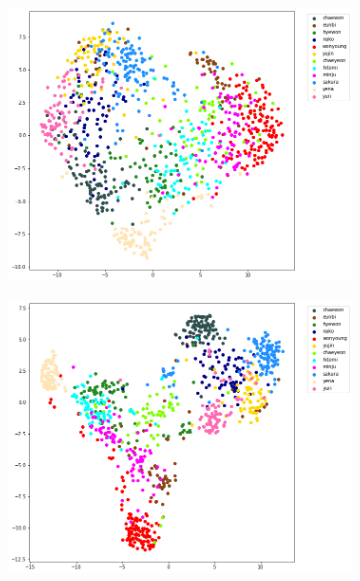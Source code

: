 \begin{enumerate}[left=0pt]
\begin{figure}[htbp]
    \centering
    \begin{subfigure}{0.24\textwidth}
        \includegraphics[trim=45 20 100 0, clip, width=\textwidth]{images/faceReco/nn1-and-triplet/tsne-1.png}     
    \end{subfigure}
    \hfill
    \begin{subfigure}{0.24\textwidth}
        \includegraphics[trim=45 20 100 0, clip, width=\textwidth]{images/faceReco/nn1-and-triplet/tsne-2.png}     
    \end{subfigure}
    \hfill
    \begin{subfigure}{0.24\textwidth}

\end{subfigure}
\end{figure}
\end{enumerate}
